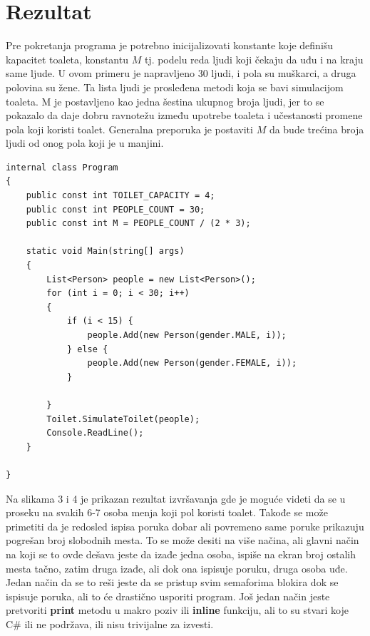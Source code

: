 \documentclass[11pt]{article}
\begin{document}
	\section{Rezultat}
	Pre pokretanja programa je potrebno inicijalizovati konstante koje definišu
	kapacitet toaleta, konstantu $M$ tj. podelu reda ljudi koji čekaju da uđu i
	na kraju same ljude.
	U ovom primeru je napravljeno 30 ljudi, i pola su muškarci, a druga polovina
	su žene.
	Ta lista ljudi je prosleđena metodi koja se bavi simulacijom toaleta.
	M je postavljeno kao jedna šestina ukupnog broja ljudi, jer to se pokazalo
	da daje dobru ravnotežu između upotrebe toaleta i učestanosti promene pola
	koji koristi toalet.
	Generalna preporuka je postaviti $M$ da bude trećina broja ljudi od onog pola
	koji je u manjini.
	\begin{lstlisting}[language={[Sharp]C}]
	internal class Program
{
    public const int TOILET_CAPACITY = 4;
    public const int PEOPLE_COUNT = 30;
    public const int M = PEOPLE_COUNT / (2 * 3);

    static void Main(string[] args)
    {
        List<Person> people = new List<Person>();
        for (int i = 0; i < 30; i++)
        {
            if (i < 15) {
                people.Add(new Person(gender.MALE, i));
            } else {
                people.Add(new Person(gender.FEMALE, i));
            }

        }
        Toilet.SimulateToilet(people);
        Console.ReadLine();
    }

}
	\end{lstlisting}
	\par Na slikama 3 i 4 je prikazan rezultat izvršavanja gde je moguće videti
	da se u proseku na svakih 6-7 osoba menja koji pol koristi toalet.
	Takođe se može primetiti da je redosled ispisa poruka dobar ali povremeno
	same poruke prikazuju pogrešan broj slobodnih mesta.
	To se može desiti na više načina, ali glavni način na koji se to ovde dešava
	jeste da izađe jedna osoba, ispiše na ekran broj ostalih mesta tačno, zatim
	druga izađe, ali dok ona ispisuje poruku, druga osoba uđe.
	Jedan način da se to reši jeste da se pristup svim semaforima blokira dok
	se ispisuje poruka, ali to će drastično usporiti program.
	Još jedan način jeste pretvoriti \textbf{print} metodu u makro poziv ili
	\textbf{inline} funkciju, ali to su stvari koje C\# ili ne podržava, ili
	nisu trivijalne za izvesti.
\end{document}
